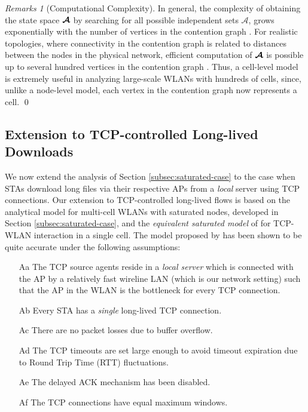 \documentclass[10pt,a4paper,journal]{IEEEtran}
\theoremstyle{definition}
\theoremstyle{remark}
\newtheorem{remark}{Remarks}[section] \newtheorem{discussion}{Discussion}[section] \newtheorem{example}{Example}[section]
\theoremstyle{plain}
\newcommand{\bmath}[1]{\mbox{\boldmath$#1$}}
\begin{document}
\begin{remark}[Computational Complexity]
\label{rmk:model-complexity}
In general, the complexity of obtaining the state space $\bmath{\mathcal{A}}$ by searching for all possible independent sets $\mathcal{A}$, grows exponentially with the number of vertices in the contention graph \cite{wanet.kershenbaum-etal87complex}. For realistic topologies, where connectivity in the contention graph is related to distances between the nodes in the physical network, efficient computation of $\bmath{\mathcal{A}}$ is possible up to several hundred vertices in the contention graph \cite{wanet.kershenbaum-etal87complex}. Thus, a cell-level model is extremely useful in analyzing large-scale WLANs with hundreds of cells, since, unlike a node-level model, each vertex in the contention graph now represents a cell. \hfill \qed

\end{remark}



\subsection{Extension to TCP-controlled Long-lived Downloads}
\label{subsec:TCP-traffic}

We now extend the analysis of Section \ref{subsec:saturated-case} to the case when STAs download long files via their respective APs from a \textit{local} server using TCP connections. Our extension to TCP-controlled long-lived flows is based on the analytical model for multi-cell WLANs with saturated nodes, developed in Section \ref{subsec:saturated-case}, and the \textit{equivalent saturated model} of \cite{wanet.bruno08TCPeqvSatModel} for TCP-WLAN interaction in a single cell. The model proposed by \cite{wanet.bruno08TCPeqvSatModel} has been shown to be quite accurate under the following assumptions:


\begin{itemize}

\item [Aa] The TCP source agents reside in a \textit{local server} which is connected with the AP by a relatively fast wireline LAN (which is our network setting) such that the AP in the WLAN is the bottleneck for every TCP connection.

\item [Ab] Every STA has a \textit{single} long-lived TCP connection.

\item [Ac] There are no packet losses due to buffer overflow.

\item [Ad] The TCP timeouts are set large enough to avoid timeout expiration due to Round Trip Time (RTT) fluctuations.

\item [Ae] The delayed ACK mechanism has been disabled.

\item [Af] The TCP connections have equal maximum windows.

\end{itemize}
\end{document}
